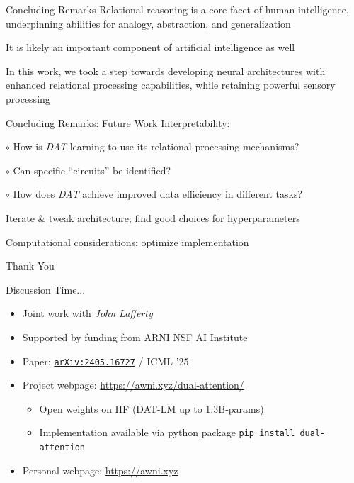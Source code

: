 \documentclass[xcolor={dvipsnames}]{beamer}
\begin{document}
\begin{frame}{Concluding Remarks}
    Relational reasoning is a core facet of human intelligence, underpinning abilities for analogy, abstraction, and generalization

    It is likely an important component of artificial intelligence as well

    In this work, we took a step towards developing neural architectures with enhanced relational processing capabilities, while retaining powerful sensory processing
\end{frame}

\begin{frame}{Concluding Remarks: Future Work}
    \alert{Interpretability:}

    $\circ$ How is \emph{DAT} learning to use its relational processing mechanisms?

    $\circ$ Can specific ``circuits'' be identified?

    $\circ$ How does \emph{DAT} achieve improved data efficiency in different tasks?

    Iterate \& tweak architecture; find good choices for hyperparameters

    \alert{Computational considerations}: optimize implementation
\end{frame}

\begin{frame}[standout]
    Thank You
\end{frame}

\begin{frame}{Discussion Time...}
    \begin{itemize}
        \item \alert{Joint work} with \emph{John Lafferty}
        \item \alert{Supported by funding from} ARNI NSF AI Institute
        \item \alert{Paper:} \href{https://arxiv.org/abs/2405.16727}{\texttt{arXiv:2405.16727}} / ICML '25
        \item \alert{Project webpage:} {\small \url{https://awni.xyz/dual-attention/}} %
        \begin{itemize}
            \item Open weights on HF (DAT-LM up to 1.3B-params)
            \item Implementation available via python package\newline
            \hphantom{~~~~~} \texttt{pip install dual-attention}
        \end{itemize}
        \item \alert{Personal webpage:} {\small \url{https://awni.xyz}}
    \end{itemize}
\end{frame}

\end{document}

